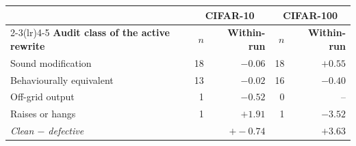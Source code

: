 \begin{tabular}{l rr rr}
\toprule
& \multicolumn{2}{c}{CIFAR-10} & \multicolumn{2}{c}{CIFAR-100} \\
\cmidrule(lr){2-3}\cmidrule(lr){4-5}
\textbf{Audit class of the active rewrite} & $n$ & \textbf{Within-run} & $n$ & \textbf{Within-run} \\
\midrule
Sound modification & 18 & $-0.06$ & 18 & $+0.55$ \\
Behaviourally equivalent & 13 & $-0.02$ & 16 & $-0.40$ \\
Off-grid output & 1 & $-0.52$ & 0 & -- \\
Raises or hangs & 1 & $+1.91$ & 1 & $-3.52$ \\
\midrule
\textit{Clean $-$ defective} & & $+-0.74$ & & $+3.63$ \\
\bottomrule
\end{tabular}
